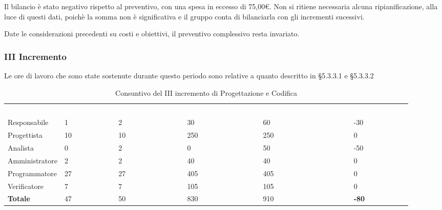 Il bilancio è stato negativo rispetto al preventivo, con una spesa in eccesso di 75,00\euro. Non si ritiene necessaria alcuna ripianificazione, alla luce di questi dati, poichè la somma non è significativa e il gruppo conta di bilanciarla con gli incrementi sucessivi.

Date le considerazioni precedenti su costi e obiettivi, il preventivo complessivo resta invariato.

\pagebreak


\subsubsection{III Incremento}
Le ore di lavoro che sono state sostenute durante questo periodo sono relative a quanto descritto in §5.3.3.1 e §5.3.3.2

\begin{table}[H]
\begin{center}
\renewcommand{\arraystretch}{1.5}
\begin{tabular}{ m{}<{\centering}  m{}<{\centering} m{}<{\centering} m{}<{\centering} m{}<{\centering} m{}<{\centering}}	\rowcolor{darkblue}
	\textcolor{white}{\textbf{Ruolo}} & \textcolor{white}{\textbf{Ore Effettive}} & \textcolor{white}{\textbf{Ore Preventivate}}&\textcolor{white}{\textbf{Costo Effettivo (\euro)}}&\textcolor{white}{\textbf{Costo Preventivato (\euro)}}&\textcolor{white}{\textbf{Differenza (\euro)}}\\ 

	Responsabile & 1 & 2 & 30 & 60 & -30 \\	
	
	Progettista & 10 & 10 & 250 & 250 & 0\\
	
	Analista & 0 & 2 & 0 & 50 & -50\\
	
	Amministratore & 2 & 2 & 40 & 40 & 0\\
	
	Programmatore & 27 & 27 & 405 & 405 & 0\\
	
	Verificatore & 7 & 7 & 105 & 105 & 0\\
	
	\textbf{Totale} & 47 & 50 & 830 & 910 & \textbf{-80} \\
	
\end{tabular}
\caption{Consuntivo del III incremento di Progettazione e Codifica}
\end{center}
\end{table}

